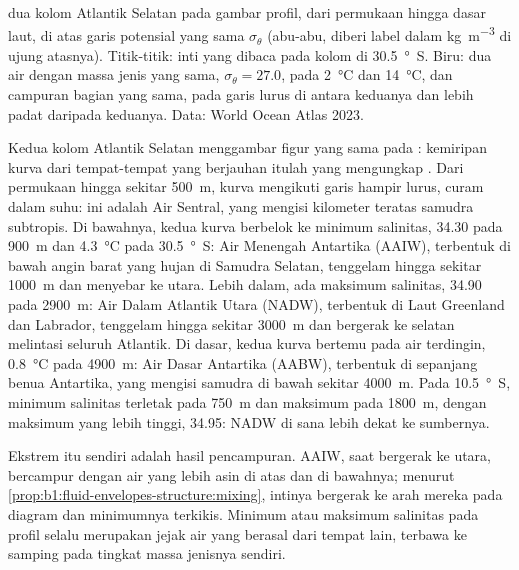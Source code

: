 \begin{omfigure}
{\small {} dua kolom Atlantik Selatan pada gambar profil, dari permukaan
hingga dasar laut, di atas garis  potensial yang sama $\sigma_\theta$
(abu-abu, diberi label dalam \si{kg.m^{-3}} di ujung atasnya). Titik-titik: inti
 yang dibaca pada kolom di \qty{30.5}{\degree S}. Biru: dua air dengan
massa jenis yang sama, $\sigma_\theta = 27.0$, pada \qty{2}{\celsius} dan \qty{14}{\celsius},
dan campuran bagian yang sama, pada garis lurus di antara keduanya dan lebih padat
daripada keduanya. Data: World Ocean Atlas 2023.}
\label{fig:b1:fluid-envelopes-structure:ts}
\end{omfigure}

Kedua kolom Atlantik Selatan menggambar figur yang sama pada : kemiripan
kurva dari tempat-tempat yang berjauhan itulah yang mengungkap . Dari
permukaan hingga sekitar \qty{500}{m}, kurva mengikuti garis hampir lurus, curam
dalam suhu: ini adalah Air Sentral, yang mengisi kilometer teratas samudra
subtropis. Di bawahnya, kedua kurva berbelok ke minimum salinitas, \num{34.30} pada
\qty{900}{m} dan \qty{4.3}{\celsius} pada \qty{30.5}{\degree S}: Air Menengah
Antartika (AAIW), terbentuk di bawah angin barat yang hujan di Samudra Selatan,
tenggelam hingga sekitar \qty{1000}{m} dan menyebar ke utara. Lebih dalam, ada
maksimum salinitas, \num{34.90} pada \qty{2900}{m}: Air Dalam Atlantik Utara (NADW),
terbentuk di Laut Greenland dan Labrador, tenggelam hingga sekitar \qty{3000}{m} dan
bergerak ke selatan melintasi seluruh Atlantik. Di dasar, kedua kurva bertemu pada
air terdingin, \qty{0.8}{\celsius} pada \qty{4900}{m}: Air Dasar Antartika (AABW),
terbentuk di sepanjang benua Antartika, yang mengisi samudra di bawah sekitar
\qty{4000}{m}. Pada \qty{10.5}{\degree S}, minimum salinitas terletak pada
\qty{750}{m} dan maksimum pada \qty{1800}{m}, dengan maksimum yang lebih tinggi,
\num{34.95}: NADW di sana lebih dekat ke sumbernya.

Ekstrem itu sendiri adalah hasil pencampuran. AAIW, saat bergerak ke utara, bercampur
dengan air yang lebih asin di atas dan di bawahnya; menurut
\cref{prop:b1:fluid-envelopes-structure:mixing}, intinya bergerak ke arah mereka pada
diagram dan minimumnya terkikis. Minimum atau maksimum salinitas pada profil selalu
merupakan jejak air yang berasal dari tempat lain, terbawa ke samping pada tingkat
massa jenisnya sendiri.

